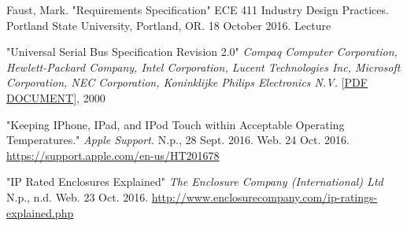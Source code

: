 

{} %

\begin{thebibliography}{}

Faust, Mark. "Requirements Specification" ECE 411 Industry Design Practices. Portland State University, Portland, OR. 18 October 2016. Lecture


"Universal Serial Bus Specification Revision 2.0"
\emph{Compaq Computer Corporation,
Hewlett-Packard Company, Intel Corporation, Lucent Technologies Inc,
Microsoft Corporation, NEC Corporation, Koninklijke Philips Electronics N.V.} \small{[\href{http://www.pjrc.com/teensy/beta/usb20.pdf\#page=206}{PDF DOCUMENT}]}, \normalsize 2000
 
"Keeping IPhone, IPad, and IPod Touch within Acceptable Operating Temperatures."
\emph{Apple Support.} N.p., 28 Sept. 2016. Web. 24 Oct. 2016. \url{https://support.apple.com/en-us/HT201678}

"IP Rated Enclosures Explained"
\emph{The Enclosure Company (International) Ltd} N.p., n.d. Web. 23 Oct. 2016. \url{http://www.enclosurecompany.com/ip-ratings-explained.php}



\end{thebibliography}







    

    


    

    
    

    
    



    

    

    

    
    